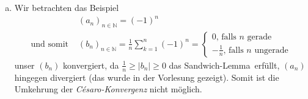 \documentclass{scrreprt}
\newcommand{\NN}{\mathbb{N}}
\begin{document}
\begin{enumerate}[(a)]
\begin{proof}
\begin{align*}
				\end{align*}
				Wir verlangen also, dass $n \in \NN$ größer als $max \lbrace n', N \rbrace$ sein muss. Damit folgt aus
				\begin{align*}
					&= \frac{1}{n} \left(\sum\limits_{k=1}^{N} |a_k - a|\right)  + \frac{\varepsilon}{2}\\
					\Rightarrow |b_n -a |& \leq \frac{\varepsilon}{2} + \frac{\varepsilon}{2} = \varepsilon\\
				\end{align*}
				die Konvergenz.
				\end{proof}
			\item
				Wir betrachten das Beispiel
				\begin{align*}
					& (a_n)_{n \in \NN} = (-1)^{n}\\
					\text{und somit } & (b_n)_{n \in \NN} = \frac{1}{n} \sum_{k=1}^{n} (-1)^{n} = \begin{cases}0 \text{, falls $n$ gerade}\\ -\frac{1}{n} \text{, falls $n$ ungerade}\end{cases}
				\end{align*}
				unser $(b_n)$ konvergiert, da $\frac{1}{n} \geq |b_n| \geq 0$ das \glqq Sandwich-Lemma\grqq \ erfüllt, $(a_n)$ hingegen divergiert (das wurde in der Vorlesung gezeigt). Somit ist die Umkehrung der \emph{Césaro-Konvergenz} nicht möglich.
		\end{enumerate}
\end{document}
